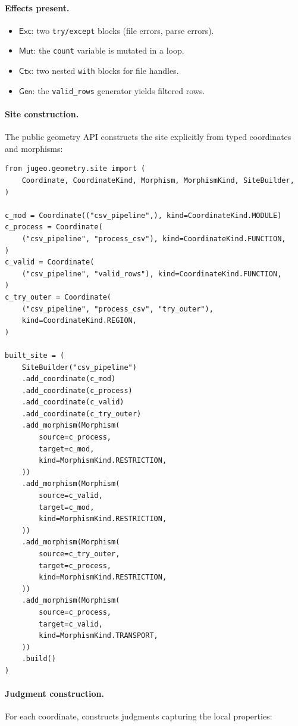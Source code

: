 \documentclass[11pt]{article}
\newcommand{\Exc}{\mathsf{Exc}}          %
\newcommand{\Mut}{\mathsf{Mut}}          %
\newcommand{\Gen}{\mathsf{Gen}}          %
\newcommand{\Ctx}{\mathsf{Ctx}}          %
\begin{document}
\paragraph{Effects present.}
\begin{itemize}[nosep]
\item $\Exc$: two \texttt{try/except} blocks (file errors, parse errors).
\item $\Mut$: the \texttt{count} variable is mutated in a loop.
\item $\Ctx$: two nested \texttt{with} blocks for file handles.
\item $\Gen$: the \texttt{valid\_rows} generator yields filtered rows.
\end{itemize}

\paragraph{Site construction.}
The public geometry API constructs the site explicitly from typed
coordinates and morphisms:

\begin{lstlisting}[style=jugeo-python,caption={JuGeo site for the CSV pipeline.}]
from jugeo.geometry.site import (
    Coordinate, CoordinateKind, Morphism, MorphismKind, SiteBuilder,
)

c_mod = Coordinate(("csv_pipeline",), kind=CoordinateKind.MODULE)
c_process = Coordinate(
    ("csv_pipeline", "process_csv"), kind=CoordinateKind.FUNCTION,
)
c_valid = Coordinate(
    ("csv_pipeline", "valid_rows"), kind=CoordinateKind.FUNCTION,
)
c_try_outer = Coordinate(
    ("csv_pipeline", "process_csv", "try_outer"),
    kind=CoordinateKind.REGION,
)

built_site = (
    SiteBuilder("csv_pipeline")
    .add_coordinate(c_mod)
    .add_coordinate(c_process)
    .add_coordinate(c_valid)
    .add_coordinate(c_try_outer)
    .add_morphism(Morphism(
        source=c_process,
        target=c_mod,
        kind=MorphismKind.RESTRICTION,
    ))
    .add_morphism(Morphism(
        source=c_valid,
        target=c_mod,
        kind=MorphismKind.RESTRICTION,
    ))
    .add_morphism(Morphism(
        source=c_try_outer,
        target=c_process,
        kind=MorphismKind.RESTRICTION,
    ))
    .add_morphism(Morphism(
        source=c_process,
        target=c_valid,
        kind=MorphismKind.TRANSPORT,
    ))
    .build()
)
\end{lstlisting}

\paragraph{Judgment construction.}
For each coordinate, \JuGeo{} constructs judgments capturing the
local properties:
\end{document}
